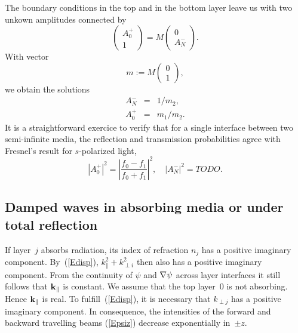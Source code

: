 The boundary conditions in the top and in the bottom layer
leave us with two unkown amplitudes connected by
\begin{equation}
  \left( \begin{array}{c}A^+_0\\1\end{array} \right)
  = M \left( \begin{array}{c}0\\A^-_N\end{array} \right).
\end{equation}
With vector
\begin{equation}
  m := M \left( \begin{array}{c}0\\1\end{array} \right),
\end{equation}
we obtain the solutions
\begin{equation}
  \begin{array}{lcl}
    A^-_N &=& 1/m_2,\\[.2ex]
    A^+_0 &=& m_1/m_2.
  \end{array}
\end{equation}
It is a straightforward exercice to verify
that for a single interface between two semi-infinite media,
the reflection and transmission probabilities
agree with Fresnel's result for $s$-polarized light,
\begin{equation}
  \left| A^+_0\right|^2
  = \left|\frac{f_0-f_1}{f_0+f_1}\right|^2,
  \quad
  \left| A^-_N\right|^2
  = TODO.
\end{equation}


\subsection{Damped waves in absorbing media
  or under total reflection}\label{s:complex}

If layer~$j$ absorbs radiation,
its index of refraction $n_j$ has a positive imaginary component.
By~(\ref{Edisp}),
$k_\parallel^2+k_{\perp i}^2$ then also has a positive imaginary component.
From the continuity of $\psi$ and $\mathbf{\nabla}\psi$ across layer interfaces
it still follows that $\mathbf{k}_\parallel$ is constant.
We assume that the top layer~0 is not absorbing.
Hence $\mathbf{k}_\parallel$ is real.
To fulfill~(\ref{Edisp}),
it is necessary that $k_{\perp j}$
has a positive imaginary component.
In consequence,
the intensities of the forward and backward travelling beams (\ref{Epsiz})
decrease exponentially in~$\pm z$.

